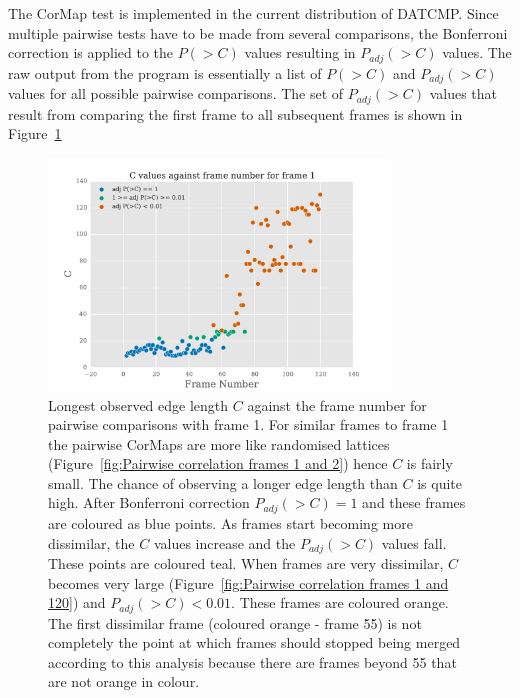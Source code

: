 The CorMap test is implemented in the current distribution of DATCMP.
Since multiple pairwise tests have to be made from several comparisons, the Bonferroni correction is applied to the $P(>C)$ values resulting in $P_{adj}(>C)$ values.
The raw output from the program is essentially a list of $P(>C)$ and $P_{adj}(>C)$ values for all possible pairwise comparisons.
The set of $P_{adj}(>C)$ values that result from comparing the first frame to all subsequent frames is shown in Figure~\ref{fig:p values for comparisons with frame 1}
\begin{figure}
    \centering
    \includegraphics[width=0.8\textwidth]{figures/saxs/scatter_asc_10.pdf}
    \caption{Longest observed edge length $C$ against the frame number for pairwise comparisons with frame 1.
    For similar frames to frame 1 the pairwise CorMaps are more like randomised lattices (Figure~\ref{fig:Pairwise correlation frames 1 and 2}) hence $C$ is fairly small.
    The chance of observing a longer edge length than $C$ is quite high.
    After Bonferroni correction $P_{adj}(>C) = 1$ and these frames are coloured as blue points.
    As frames start becoming more dissimilar, the $C$ values increase and the $P_{adj}(>C)$ values fall.
    These points are coloured teal.
    When frames are very dissimilar, $C$ becomes very large (Figure~\ref{fig:Pairwise correlation frames 1 and 120}) and $P_{adj}(>C) < 0.01$.
    These frames are coloured orange.
    The first dissimilar frame (coloured orange - frame 55) is not completely the point at which frames should stopped being merged according to this analysis because there are frames beyond 55 that are not orange in colour.}
    \label{fig:p values for comparisons with frame 1}
\end{figure}

